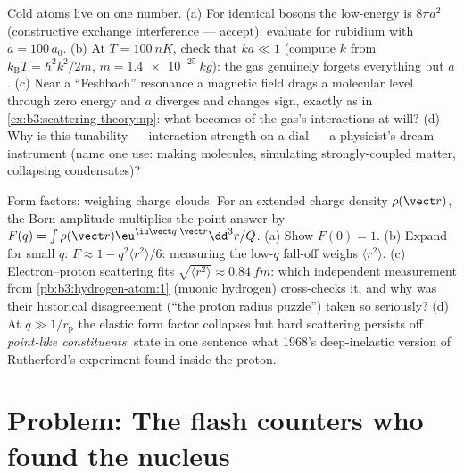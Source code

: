 \begin{exercise}[$\star\star\star$]\label{exo:b3:scattering-theory:11}
Cold atoms live on one number. (a) For identical bosons the
low-energy  is $8\pi a^2$ (constructive exchange
interference --- accept): evaluate for rubidium with $a =
100\,a_0$. (b) At $T = \qty{100}{nK}$, check that $ka \ll 1$
(compute $k$ from $k_{\text{B}}T = \hbar^2k^2/2m$, $m =
\qty{1.4e-25}{kg}$): the gas genuinely forgets everything but $a$.
(c) Near a ``Feshbach'' resonance a magnetic field drags a
molecular level through zero energy and $a$ diverges and changes
sign, exactly as in \cref{ex:b3:scattering-theory:np}: what
becomes of the gas's interactions at will? (d) Why is this
tunability --- interaction strength on a dial --- a physicist's
dream instrument (name one use: making molecules, simulating
strongly-coupled matter, collapsing condensates)?
\end{exercise}

\begin{exercise}[$\star\star\star$]\label{exo:b3:scattering-theory:12}
Form factors: weighing charge clouds. For an extended charge
density $\rho(\vect r)$, the Born amplitude multiplies the point
answer by $F(q) = \int\rho(\vect r)\eu^{\iu\vect q\cdot\vect r}
\dd^3r/Q$. (a) Show $F(0) = 1$. (b) Expand for small $q$: $F
\approx 1 - q^2\langle r^2\rangle/6$: measuring the low-$q$
fall-off weighs $\langle r^2\rangle$. (c) Electron--proton
scattering fits $\sqrt{\langle r^2\rangle} \approx \qty{0.84}{fm}$:
which independent measurement from
\cref{pb:b3:hydrogen-atom:1} (muonic hydrogen) cross-checks it,
and why was their historical disagreement (``the proton radius
puzzle'') taken so seriously? (d) At $q \gg 1/r_{\text{p}}$ the
elastic form factor collapses but hard scattering persists off
\emph{point-like constituents}: state in one sentence what 1968's
deep-inelastic version of Rutherford's experiment found inside
the proton.
\end{exercise}

\section{Problem: The flash counters who found the nucleus}

